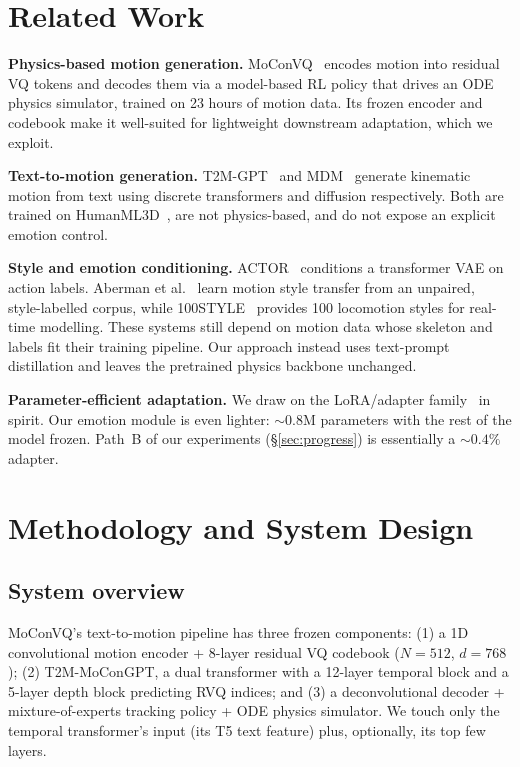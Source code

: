 \documentclass[conference]{IEEEtran}
\begin{document}
\section{Related Work}
\textbf{Physics-based motion generation.}
MoConVQ~\cite{yao2023moconvq} encodes motion into residual VQ tokens and
decodes them via a model-based RL policy that drives an ODE physics
simulator, trained on 23 hours of motion data. Its frozen encoder and
codebook make it well-suited for lightweight downstream adaptation,
which we exploit.

\textbf{Text-to-motion generation.}
T2M-GPT~\cite{zhang2023t2m} and MDM~\cite{tevet2022human} generate
kinematic motion from text using discrete transformers and diffusion
respectively. Both are trained on
HumanML3D~\cite{guo2022generating}, are not physics-based, and do not
expose an explicit emotion control.

\textbf{Style and emotion conditioning.}
ACTOR~\cite{petrovich2021action} conditions a transformer VAE on action
labels. Aberman et al.~\cite{aberman2020unpaired} learn motion style transfer
from an unpaired, style-labelled corpus, while 100STYLE~\cite{mason2022style}
provides 100 locomotion styles for real-time modelling. These systems still
depend on motion data whose skeleton and labels fit their training pipeline.
Our approach instead uses text-prompt distillation and leaves the pretrained
physics backbone unchanged.

\textbf{Parameter-efficient adaptation.}
We draw on the LoRA/adapter family~\cite{hu2022lora} in spirit. Our
emotion module is even lighter: $\sim$0.8M parameters with the rest of
the model frozen. Path~B of our experiments (\S\ref{sec:progress}) is
essentially a $\sim\!0.4\%$ adapter.

\section{Methodology and System Design}
\label{sec:method}

\subsection{System overview}
MoConVQ's text-to-motion pipeline has three frozen components: (1) a 1D
convolutional motion encoder + 8-layer residual VQ codebook
($N\!=\!512$, $d\!=\!768$); (2) T2M-MoConGPT, a dual transformer with a
12-layer temporal block and a 5-layer depth block predicting RVQ indices;
and (3) a deconvolutional decoder + mixture-of-experts tracking policy +
ODE physics simulator. We touch only the temporal transformer's input
(its T5 text feature) plus, optionally, its top few layers.
\end{document}
